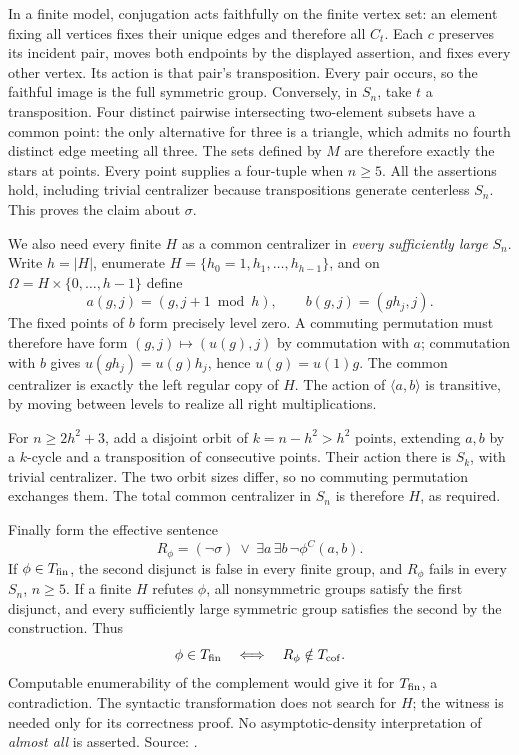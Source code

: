 In a finite model, conjugation acts faithfully on
the finite vertex set: an element fixing all vertices
fixes their unique edges and therefore all \(C_t\).
Each \(c\) preserves its incident pair, moves both
endpoints by the displayed assertion, and fixes
every other vertex. Its action is that pair's
transposition. Every pair occurs, so the faithful
image is the full symmetric group.
Conversely, in \(S_n\), take \(t\) a transposition.
Four distinct pairwise intersecting two-element
subsets have a common point: the only alternative
for three is a triangle, which admits no fourth
distinct edge meeting all three. The sets defined
by \(M\) are therefore exactly the stars at points.
Every point supplies a four-tuple when \(n\geq5\).
All the assertions hold, including trivial
centralizer because transpositions generate
centerless \(S_n\). This proves the claim about
\(\sigma\).

We also need every finite \(H\) as a common
centralizer in \emph{every sufficiently large}
\(S_n\). Write \(h=|H|\), enumerate
\(H=\{h_0=1,h_1,\ldots,h_{h-1}\}\), and on
\(\Omega=H\times\{0,\ldots,h-1\}\) define
\[
 a(g,j)=(g,j+1\bmod h),\qquad b(g,j)=(gh_j,j).
\]
The fixed points of \(b\) form precisely level zero.
A commuting permutation must therefore have form
\((g,j)\mapsto(u(g),j)\) by commutation with \(a\);
commutation with \(b\) gives
\(u(gh_j)=u(g)h_j\), hence \(u(g)=u(1)g\).
The common centralizer is exactly the left regular
copy of \(H\). The action of \(\langle a,b\rangle\)
is transitive, by moving between levels to realize
all right multiplications.

For \(n\geq2h^2+3\), add a disjoint orbit of
\(k=n-h^2>h^2\) points, extending \(a,b\) by
a \(k\)-cycle and a transposition of consecutive
points. Their action there is \(S_k\), with
trivial centralizer. The two orbit sizes differ,
so no commuting permutation exchanges them.
The total common centralizer in \(S_n\) is
therefore \(H\), as required.

Finally form the effective sentence
\[
 R_\phi=(\neg\sigma)\ \vee\
             \exists a\,\exists b\,\neg\phi^C(a,b).
\]
If \(\phi\in T_{\rm fin}\), the second disjunct
is false in every finite group, and \(R_\phi\)
fails in every \(S_n\), \(n\geq5\). If a finite
\(H\) refutes \(\phi\), all nonsymmetric groups
satisfy the first disjunct, and every sufficiently
large symmetric group satisfies the second by
the construction. Thus
\[
 \phi\in T_{\rm fin}\quad\Longleftrightarrow\quad
 R_\phi\notin T_{\rm cof}.
\]
Computable enumerability of the complement would
give it for \(T_{\rm fin}\), a contradiction.
The syntactic transformation does not search for
\(H\); the witness is needed only for its correctness
proof. No asymptotic-density interpretation of
\emph{almost all} is asserted. Source:
.

